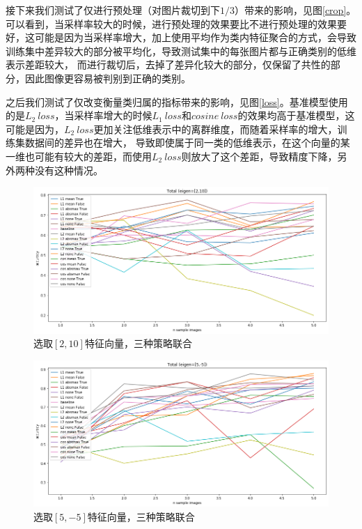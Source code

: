 \documentclass{ctexart}
\begin{document}
    接下来我们测试了仅进行预处理（对图片裁切到下$1/3$）带来的影响，见图\ref{crop}。可以看到，当采样率较大的时候，进行预处理的效果要比不进行预处理的效果要好，这可能是因为当采样率增大，加上使用平均作为类内特征聚合的方式，会导致训练集中差异较大的部分被平均化，导致测试集中的每张图片都与正确类别的低维表示差距较大，
    而进行裁切后，去掉了差异化较大的部分，仅保留了共性的部分，因此图像更容易被判别到正确的类别。

    之后我们测试了仅改变衡量类归属的指标带来的影响，见图\ref{loss}。基准模型使用的是$L_2 \ loss$，当采样率增大的时候$L_1 \ loss$和$cosine \ loss$的效果均高于基准模型，这可能是因为，$L_2 \ loss$更加关注低维表示中的离群维度，而随着采样率的增大，训练集数据间的差异也在增大，
    导致即使属于同一类的低维表示，在这个向量的某一维也可能有较大的差距，而使用$L_2 \ loss$则放大了这个差距，导致精度下降，另外两种没有这种情况。

    \begin{figure}[htbp]
        \centering
        \includegraphics[scale=0.45]{imgs/total1.png}
        \caption{选取$[2,10]$特征向量，三种策略联合}
        \label{total1}
    \end{figure}
    \begin{figure}[htbp]
        \centering
        \includegraphics[scale=0.45]{imgs/total2.png}
        \caption{选取$[5,-5]$特征向量，三种策略联合}
        \label{total2}
    \end{figure}
\end{document}
